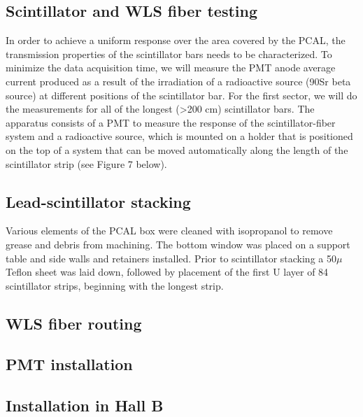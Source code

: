 \subsection{Scintillator and WLS fiber testing}
In order to achieve a uniform response over the area covered by the PCAL, the transmission properties of the scintillator bars needs to be characterized. To minimize the data acquisition time, we will measure the PMT anode average current produced as a result of the irradiation of a radioactive source (90Sr beta source) at different positions of the scintillator bar. For the first sector, we will do the measurements for all of the longest (>200 cm) scintillator bars. The apparatus consists of a PMT to measure the response of the scintillator-fiber system and a radioactive source, which is mounted on a holder that is positioned on the top of a system that can be moved automatically along the length of the scintillator strip (see Figure 7 below).

\subsection{Lead-scintillator stacking}
Various elements of the PCAL box were cleaned with isopropanol to remove grease and debris from machining.  The bottom window was placed on a support table and side walls and retainers installed. Prior to scintillator stacking a 50$\mu$ Teflon sheet was laid down, followed by placement of the first U layer of 84 scintillator strips, beginning with the longest strip.
\subsection{WLS fiber routing}

\subsection{PMT installation}
\subsection{Installation in Hall B}









